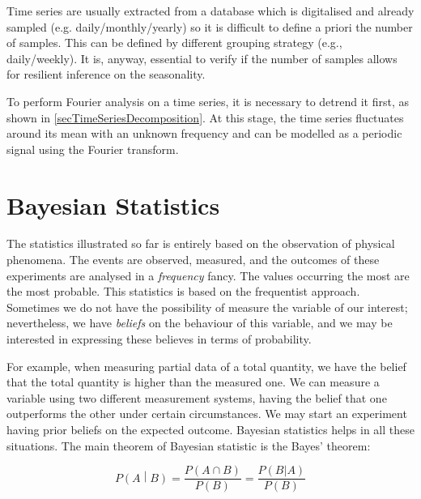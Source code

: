 Time series are usually extracted from a database which is digitalised and already sampled (e.g. daily/monthly/yearly) so it is difficult to define a priori the number of samples. This can be defined by different grouping strategy (e.g., daily/weekly). It is, anyway, essential to verify if the number of samples allows for resilient inference on the seasonality.\par

To perform Fourier analysis on a time series, it is necessary to detrend it first, as shown in \ref{secTimeSeriesDecomposition}. At this stage, the time series fluctuates around its mean with an unknown frequency and can be modelled as a periodic signal using the Fourier transform. 

\section{Bayesian Statistics} \label{secBayesTheorem}
The statistics illustrated so far is entirely based on the observation of physical phenomena. The events are observed, measured, and the outcomes of these experiments are analysed in a \textit{frequency} fancy. The values occurring the most are the most probable. This statistics is based on the frequentist approach. Sometimes we do not have the possibility of measure the variable of our interest; nevertheless, we have \textit{beliefs} on the behaviour of this variable, and we may be interested in expressing these believes in terms of probability. \par

For example, when measuring partial data of a total quantity, we have the belief that the total quantity is higher than the measured one. We can measure a variable using two different measurement systems, having the belief that one outperforms the other under certain circumstances. We may start an experiment having prior beliefs on the expected outcome. Bayesian statistics helps in all these situations. The main theorem of Bayesian statistic is the Bayes’ theorem:

\begin{equation}
P\left(A\middle| B\right)=\frac{P(A\cap B)}{P(B)}=\frac{P(B|A)}{P(B)}
\label{eq_bayesTheorem}
\end{equation}

